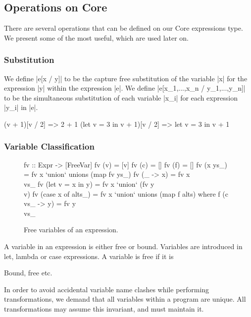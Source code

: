 \subsection{Operations on Core}

There are several operations that can be defined on our Core expressions type. We present some of the most useful, which are used later on.

\subsubsection{Substitution}

We define |e[x / y]| to be the capture free substitution of the variable |x| for the expression |y| within the expression |e|. We define |e[x_1,...,x_n / y_1,...,y_n]| to be the simultaneous substitution of each variable |x_i| for each expression |y_i| in |e|.

\begin{example}
\begin{code}
(v + 1)[v / 2]               => 2 + 1
(let v = 3 in v + 1)[v / 2]  => let v = 3 in v + 1
\end{code}
\end{example}

\subsubsection{Variable Classification}

\begin{figure}
\begin{code}
fv :: Expr -> [FreeVar]
fv (v) = [v]
fv (c) = []
fv (f) = []
fv (x ys_) = fv x `union` unions (map fv ys_)
fv (\vs_ -> x) = fv x \\ vs_
fv (let v = x in y) = fv x `union` (fv y \\ v)
fv (case x of alts_) = fv x `union` unions (map f alts)
    where f (c vs_ -> y) = fv y \\ vs_
\end{code}
\caption{Free variables of an expression.}
\label{fig:free_variables}
\end{figure}

A variable in an expression is either free or bound. Variables are introduced in let, lambda or case expressions. A variable is free if it is


Bound, free etc.

In order to avoid accidental variable name clashes while performing transformations, we demand that all variables within a program are unique. All transformations may assume this invariant, and must maintain it.



